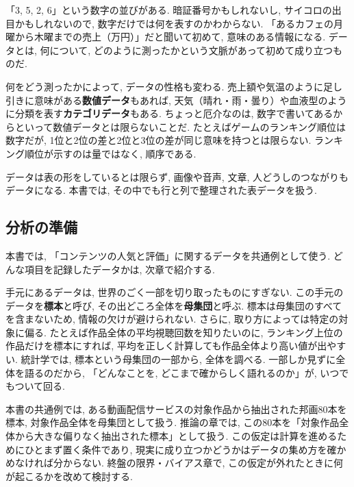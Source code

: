 \begin{tcolorbox}[
  colback=gray!5,
  colframe=gray!50,
  arc=4mm,
  boxrule=0.5pt,
  title={\textbf{コラム：データとは何か}},
  fonttitle=\large
]

「3, 5, 2, 6」という数字の並びがある.
暗証番号かもしれないし, サイコロの出目かもしれないので, 数字だけでは何を表すのかわからない.
「あるカフェの月曜から木曜までの売上（万円）」だと聞いて初めて, 意味のある情報になる.
データとは, 何について, どのように測ったかという文脈があって初めて成り立つものだ.

何をどう測ったかによって, データの性格も変わる.
売上額や気温のように足し引きに意味がある\textbf{数値データ}もあれば,
天気（晴れ・雨・曇り）や血液型のように分類を表す\textbf{カテゴリデータ}もある.
ちょっと厄介なのは, 数字で書いてあるからといって数値データとは限らないことだ.
たとえばゲームのランキング順位は数字だが, 1位と2位の差と2位と3位の差が同じ意味を持つとは限らない.
ランキング順位が示すのは量ではなく, 順序である.

データは表の形をしているとは限らず, 画像や音声, 文章, 人どうしのつながりもデータになる.
本書では, その中でも行と列で整理された表データを扱う.

\end{tcolorbox}

  \subsection{分析の準備}

    本書では, 「コンテンツの人気と評価」に関するデータを共通例として使う.
    どんな項目を記録したデータかは, 次章で紹介する.

    手元にあるデータは, 世界のごく一部を切り取ったものにすぎない.
    この手元のデータを\textbf{標本}と呼び, その出どころ全体を\textbf{母集団}と呼ぶ.
    標本は母集団のすべてを含まないため, 情報の欠けが避けられない.
    さらに, 取り方によっては特定の対象に偏る.
    たとえば作品全体の平均視聴回数を知りたいのに, ランキング上位の作品だけを標本にすれば, 平均を正しく計算しても作品全体より高い値が出やすい.
    統計学では, 標本という母集団の一部から, 全体を調べる.
    一部しか見ずに全体を語るのだから, 「どんなことを, どこまで確からしく語れるのか」が, いつでもついて回る.

    本書の共通例では, ある動画配信サービスの対象作品から抽出された邦画80本を標本, 対象作品全体を母集団として扱う.
    推論の章では, この80本を「対象作品全体から大きな偏りなく抽出された標本」として扱う.
    この仮定は計算を進めるためにひとまず置く条件であり, 現実に成り立つかどうかはデータの集め方を確かめなければ分からない.
    終盤の限界・バイアス章で, この仮定が外れたときに何が起こるかを改めて検討する.

